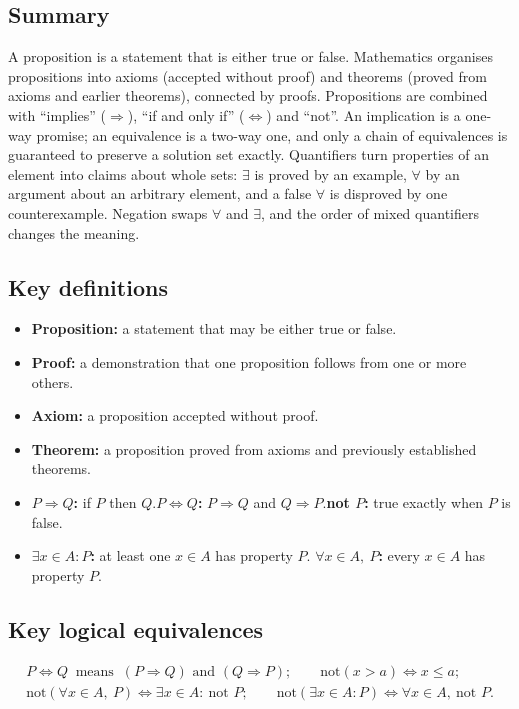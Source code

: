 \subsection*{Summary}
A proposition is a statement that is either true or false. Mathematics organises propositions into
axioms (accepted without proof) and theorems (proved from axioms and earlier theorems), connected by
proofs. Propositions are combined with ``implies'' ($\Rightarrow$), ``if and only if'' ($\Leftrightarrow$)
and ``not''. An implication is a one-way promise; an equivalence is a two-way one, and only a chain of
equivalences is guaranteed to preserve a solution set exactly. Quantifiers turn properties of an element
into claims about whole sets: $\exists$ is proved by an example, $\forall$ by an argument about an
arbitrary element, and a false $\forall$ is disproved by one counterexample. Negation swaps $\forall$ and
$\exists$, and the order of mixed quantifiers changes the meaning.

\subsection*{Key definitions}
\begin{itemize}
  \item \textbf{Proposition:} a statement that may be either true or false.
  \item \textbf{Proof:} a demonstration that one proposition follows from one or more others.
  \item \textbf{Axiom:} a proposition accepted without proof.
  \item \textbf{Theorem:} a proposition proved from axioms and previously established theorems.
  \item \textbf{$P\Rightarrow Q$:} if $P$ then $Q$.\quad \textbf{$P\Leftrightarrow Q$:} $P\Rightarrow Q$ and
  $Q\Rightarrow P$.\quad \textbf{not $P$:} true exactly when $P$ is false.
  \item \textbf{$\exists x\in A: P$:} at least one $x\in A$ has property $P$.\quad
  \textbf{$\forall x\in A,\ P$:} every $x\in A$ has property $P$.
\end{itemize}

\subsection*{Key logical equivalences}
\begin{gather*}
P\Leftrightarrow Q\ \text{ means }\ (P\Rightarrow Q)\text{ and }(Q\Rightarrow P);\qquad
\text{not}(x>a)\Leftrightarrow x\le a;\\
\text{not}(\forall x\in A,\ P)\Leftrightarrow \exists x\in A:\ \text{not }P;\qquad
\text{not}(\exists x\in A: P)\Leftrightarrow \forall x\in A,\ \text{not }P.
\end{gather*}

